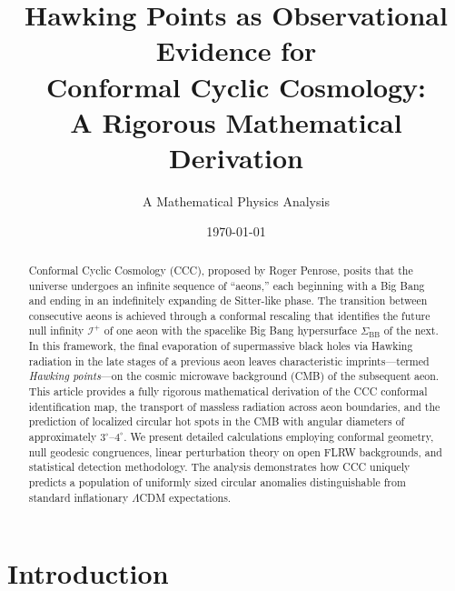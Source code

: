 \documentclass[11pt,a4paper]{article}
\theoremstyle{plain}
\theoremstyle{definition}
\theoremstyle{remark}
\newcommand{\scriplus}{\mathcal{I}^+}
\newcommand{\sigmabb}{\Sigma_{\mathrm{BB}}}
\begin{document}
\title{Hawking Points as Observational Evidence for\\
Conformal Cyclic Cosmology:\\
A Rigorous Mathematical Derivation}

\author{A Mathematical Physics Analysis}

\date{\today}

\maketitle

\begin{abstract}
Conformal Cyclic Cosmology (CCC), proposed by Roger Penrose, posits that the universe undergoes an infinite sequence of ``aeons,'' each beginning with a Big Bang and ending in an indefinitely expanding de Sitter-like phase. The transition between consecutive aeons is achieved through a conformal rescaling that identifies the future null infinity $\scriplus$ of one aeon with the spacelike Big Bang hypersurface $\sigmabb$ of the next. In this framework, the final evaporation of supermassive black holes via Hawking radiation in the late stages of a previous aeon leaves characteristic imprints---termed \emph{Hawking points}---on the cosmic microwave background (CMB) of the subsequent aeon. This article provides a fully rigorous mathematical derivation of the CCC conformal identification map, the transport of massless radiation across aeon boundaries, and the prediction of localized circular hot spots in the CMB with angular diameters of approximately $3^\circ$--$4^\circ$. We present detailed calculations employing conformal geometry, null geodesic congruences, linear perturbation theory on open FLRW backgrounds, and statistical detection methodology. The analysis demonstrates how CCC uniquely predicts a population of uniformly sized circular anomalies distinguishable from standard inflationary $\Lambda$CDM expectations.
\end{abstract}

\tableofcontents
\newpage

\section{Introduction}\label{sec:introduction}
\end{document}

